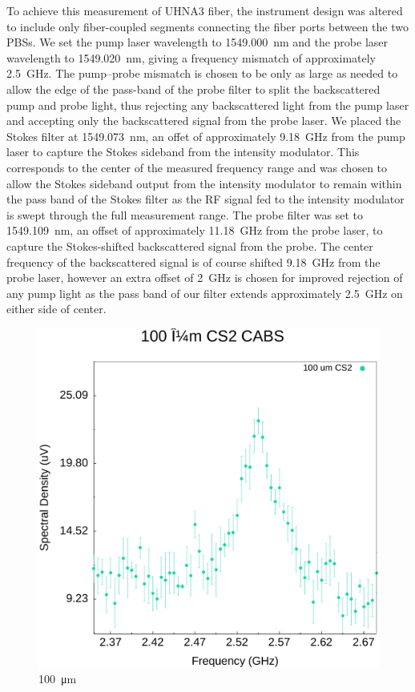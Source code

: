 To achieve this measurement of \ac{UHNA3} fiber, the instrument design was altered to include only fiber-coupled segments connecting the fiber ports between the two \ac{PBS}s. We set the pump laser wavelength to \SI{1549.000}{\nano\meter} and the probe laser wavelength to \SI{1549.020}{\nano\meter}, giving a frequency mismatch of approximately \SI{2.5}{\giga\hertz}. The pump--probe mismatch is chosen to be only as large as needed to allow the edge of the pass-band of the probe filter to split the backscattered pump and probe light, thus rejecting any backscattered light from the pump laser and accepting only the backscattered signal from the probe laser. We placed the Stokes filter at \SI{1549.073}{\nano\meter}, an offet of approximately \SI{9.18}{\giga\hertz} from the pump laser to capture the Stokes sideband from the intensity modulator. This corresponds to the center of the measured frequency range and was chosen to allow the Stokes sideband output from the intensity modulator to remain within the pass band of the Stokes filter as the RF signal fed to the intensity modulator is swept through the full measurement range. The probe filter was set to \SI{1549.109}{\nano\meter}, an offset of approximately \SI{11.18}{\giga\hertz} from the probe laser, to capture the Stokes-shifted backscattered signal from the probe. The center frequency of the backscattered signal is of course shifted \SI{9.18}{\giga\hertz} from the probe laser, however an extra offset of \SI{2}{\giga\hertz} is chosen for improved rejection of any pump light as the pass band of our filter extends approximately \SI{2.5}{\giga\hertz} on either side of center.

\begin{figure}[t!]
  \centering
  \includegraphics[width=\textwidth]{figs/3-CoBS/100umCS2.pdf}
  \caption{\SI{100}{\micro\meter} }
  \label{fig:100umCS2}
\end{figure}

